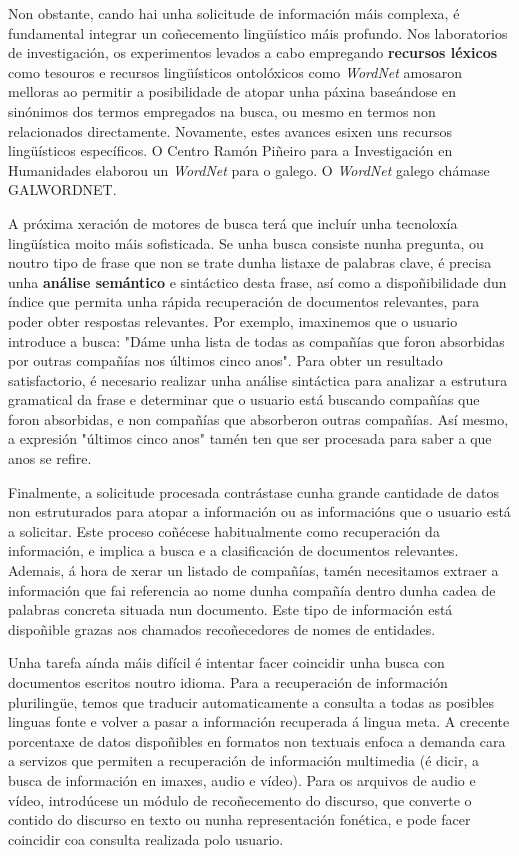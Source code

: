 \begin{multicols}{2}
Non obstante, cando hai unha solicitude de información máis complexa, é fundamental integrar un coñecemento lingüístico máis profundo. Nos laboratorios de investigación, os experimentos levados a cabo empregando \textbf{recursos léxicos} como tesouros e recursos lingüísticos ontolóxicos como \textit{WordNet} amosaron melloras ao permitir a posibilidade de atopar unha páxina baseándose en sinónimos dos termos empregados na busca, ou mesmo en termos non relacionados directamente. Novamente, estes avances esixen uns recursos lingüísticos específicos. O Centro Ramón Piñeiro para a Investigación en Humanidades \cite{GAL-Nota24} elaborou un \textit{WordNet} para o galego. O \textit{WordNet} galego chámase GALWORDNET.

A próxima xeración de motores de busca terá que incluír unha tecnoloxía lingüística moito máis sofisticada. Se unha busca consiste nunha pregunta, ou noutro tipo de frase que non se trate dunha listaxe de palabras clave, é precisa unha \textbf{análise semántico} e sintáctico desta frase, así como a dispoñibilidade dun índice que permita unha rápida recuperación de documentos relevantes, para poder obter respostas relevantes. Por exemplo, imaxinemos que o usuario introduce a busca: "Dáme unha lista de todas as compañías que foron absorbidas por outras compañías nos últimos cinco anos". Para obter un resultado satisfactorio, é necesario realizar unha análise sintáctica para analizar a estrutura gramatical da frase e determinar que o usuario está buscando compañías que foron absorbidas, e non compañías que absorberon outras compañías. Así mesmo, a expresión "últimos cinco anos" tamén ten que ser procesada para saber a que anos se refire. 

Finalmente, a solicitude procesada contrástase cunha grande cantidade de datos non estruturados para atopar a información ou as informacións que o usuario está a solicitar. Este proceso coñécese habitualmente como recuperación da información, e implica a busca e a clasificación de documentos relevantes. Ademais, á hora de xerar un listado de compañías, tamén necesitamos extraer a información que fai referencia ao nome dunha compañía dentro dunha cadea de palabras concreta situada nun documento. Este tipo de información está dispoñible grazas aos chamados recoñecedores de nomes de entidades. 

Unha tarefa aínda máis difícil é intentar facer coincidir unha busca con documentos escritos noutro idioma. Para a recuperación de información plurilingüe, temos que traducir automaticamente a consulta a todas as posibles linguas fonte e volver a pasar a información recuperada á lingua meta. A crecente porcentaxe de datos dispoñibles en formatos non textuais enfoca a demanda cara a servizos que permiten a recuperación de información multimedia (é dicir, a busca de información en imaxes, audio e vídeo). Para os arquivos de audio e vídeo, introdúcese un módulo de recoñecemento do discurso, que converte o contido do discurso en texto ou nunha representación fonética, e pode facer coincidir coa consulta realizada polo usuario.


\end{multicols}
